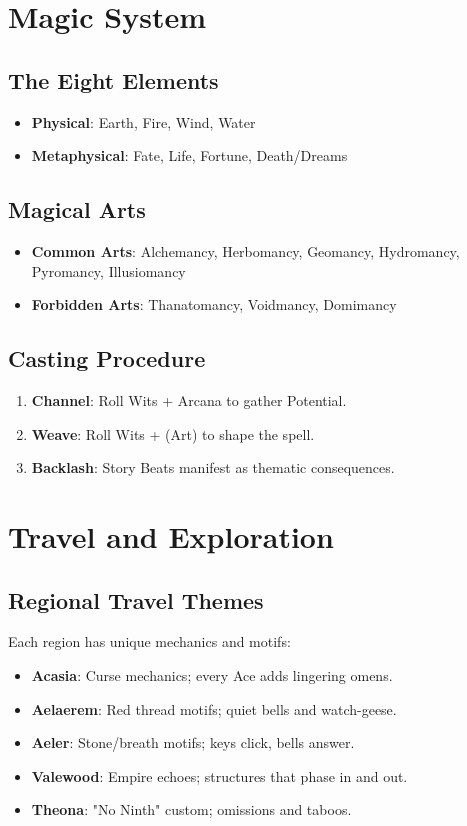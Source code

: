 \documentclass[11pt,twoside]{article}
\begin{document}
\section{Magic System}

\subsection{The Eight Elements}
\begin{itemize}[leftmargin=*]
    \item \textbf{Physical}: Earth, Fire, Wind, Water
    \item \textbf{Metaphysical}: Fate, Life, Fortune, Death/Dreams
\end{itemize}

\subsection{Magical Arts}
\begin{itemize}[leftmargin=*]
    \item \textbf{Common Arts}: Alchemancy, Herbomancy, Geomancy, Hydromancy, Pyromancy, Illusiomancy
    \item \textbf{Forbidden Arts}: Thanatomancy, Voidmancy, Domimancy
\end{itemize}

\subsection{Casting Procedure}
\begin{enumerate}[leftmargin=*]
    \item \textbf{Channel}: Roll Wits + Arcana to gather Potential.
    \item \textbf{Weave}: Roll Wits + (Art) to shape the spell.
    \item \textbf{Backlash}: Story Beats manifest as thematic consequences.
\end{enumerate}

\section{Travel and Exploration}

\subsection{Regional Travel Themes}
Each region has unique mechanics and motifs:
\begin{itemize}[leftmargin=*]
    \item \textbf{Acasia}: Curse mechanics; every Ace adds lingering omens.
    \item \textbf{Aelaerem}: Red thread motifs; quiet bells and watch-geese.
    \item \textbf{Aeler}: Stone/breath motifs; keys click, bells answer.
    \item \textbf{Valewood}: Empire echoes; structures that phase in and out.
    \item \textbf{Theona}: "No Ninth" custom; omissions and taboos.
\end{itemize}
\end{document}
